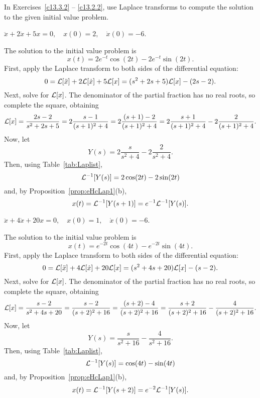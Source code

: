 \documentclass{ximera}
\begin{document}
\noindent In Exercises~\ref{c13.3.2} -- \ref{c13.2.2}, use Laplace transforms 
to compute the solution to the given initial value problem.
\begin{exercise} \label{c13.3.2}
$\ddot{x} + 2\dot x +5x = 0, \quad x(0) = 2, \quad \dot{x}(0) = -6$.

\begin{solution}
\ans The solution to the initial value problem is
\[
x(t) = 2e^{-t}\cos(2t) - 2e^{-t}\sin(2t).
\]
\soln First, apply the Laplace transform to both sides of the differential
equation:
\[
0 = {\cal L}[\ddot{x}] + 2{\cal L}[\dot{x}] + 5{\cal L}[x]
= (s^2 + 2s + 5){\cal L}[x] - (2s - 2).
\]
Next, solve for ${\cal L}[x]$.  The denominator of the partial fraction
has no real roots, so complete the square, obtaining
\[
{\cal L}[x]
= \frac{2s - 2}{s^2 + 2s + 5}
= 2\frac{s - 1}{(s + 1)^2 + 4}
= 2\frac{(s + 1) - 2}{(s + 1)^2 + 4}
= 2\frac{s + 1}{(s + 1)^2 + 4} - 2\frac{2}{(s + 1)^2 + 4}.
\]
Now, let
\[
Y(s) = 2\frac{s}{s^2 + 4} - 2\frac{2}{s^2 + 4}.
\]
Then, using Table~\ref{tab:Laplist},
\[
{\cal L}^{-1}[Y(s)] = 2\cos(2t) - 2\sin(2t)
\]
and, by Proposition~\ref{prop:eHcLap1}(b),
\[
x(t) = {\cal L}^{-1}[Y(s + 1)] = e^{-1}{\cal L}^{-1}[Y(s)].
\]


\end{solution}
\end{exercise}
\begin{exercise} \label{c13.4.3a}
$\ddot x +4\dot x +20 x=0,\quad x(0)=1,\quad \dot{x}(0)=-6$.

\begin{solution}
\ans The solution to the initial value problem is
\[
x(t) = e^{-2t}\cos(4t) - e^{-2t}\sin(4t).
\]
\soln First, apply the Laplace transform to both sides of the differential
equation:
\[
0 = {\cal L}[\ddot{x}] + 4{\cal L}[\dot{x}] + 20{\cal L}[x]
= (s^2 + 4s + 20){\cal L}[x] - (s - 2).
\]
Next, solve for ${\cal L}[x]$.  The denominator of the partial fraction
has no real roots, so complete the square, obtaining
\[
{\cal L}[x]
= \frac{s - 2}{s^2 + 4s + 20}
= \frac{s - 2}{(s + 2)^2 + 16}
= \frac{(s + 2) - 4}{(s + 2)^2 + 16}
= \frac{s + 2}{(s + 2)^2 + 16} - \frac{4}{(s + 2)^2 + 16}.
\]
Now, let
\[
Y(s) = \frac{s}{s^2 + 16} - \frac{4}{s^2 + 16}.
\]
Then, using Table~\ref{tab:Laplist},
\[
{\cal L}^{-1}[Y(s)] = \cos(4t) - \sin(4t)
\]
and, by Proposition~\ref{prop:eHcLap1}(b),
\[
x(t) = {\cal L}^{-1}[Y(s + 2)] = e^{-2}{\cal L}^{-1}[Y(s)].
\]


\end{solution}
\end{exercise}
\end{document}
